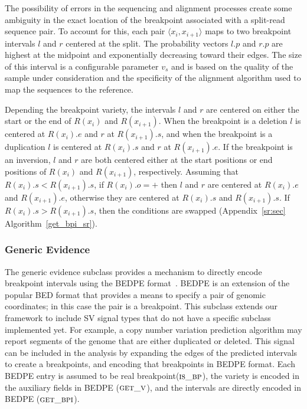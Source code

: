 \documentclass[10pt]{bmc_article}
\newenvironment{bmcformat}{\begin{raggedright}\baselineskip20pt\sloppy\setboolean{publ}{false}}{\end{raggedright}\baselineskip20pt\sloppy}
\begin{document}
\begin{bmcformat}
The possibility of errors in the sequencing and alignment processes create some
ambiguity in the exact location of the breakpoint associated with a split-read
sequence pair.  To account for this, each pair $\langle x_i, x_{i+1} \rangle$
maps to two breakpoint intervals $l$ and $r$ centered at the split. The
probability vectors $l.p$ and $r.p$ are highest at the midpoint and
exponentially decreasing toward their edges.  The size of this interval is a
configurable parameter $v_s$ and is based on the quality of the sample under
consideration and the specificity of the alignment algorithm used to map the
sequences to the reference.

Depending the breakpoint variety, the intervals $l$ and $r$ are centered on
either the start or the end of $R(x_i)$ and $R(x_{i+1})$.  When the breakpoint
is a deletion $l$ is centered at $R(x_i).e$ and $r$ at $R(x_{i+1}).s$, and when
the breakpoint is a duplication $l$ is centered at $R(x_i).s$ and $r$ at
$R(x_{i+1}).e$.  If the breakpoint is an inversion, $l$ and $r$ are both
centered either at the start positions or end positions of $R(x_i)$ and
$R(x_{i+1})$, respectively.  Assuming that $R(x_i).s<R(x_{i+1}).s$, if
$R(x_i).o=+$ then $l$ and $r$ are centered at $R(x_i).e$ and  $R(x_{i+1}).e$,
otherwise they are centered at $R(x_i).s$ and  $R(x_{i+1}).s$.  If
$R(x_i).s>R(x_{i+1}).s$, then the conditions are swapped
(Appendix~\ref{sr:sec} Algorithm~\ref{get_bpi_sr}).

\subsubsection*{Generic Evidence}

The generic evidence subclass provides a mechanism to directly encode breakpoint
intervals using the BEDPE format~\cite{quinlan2010a}.  BEDPE is an extension of
the popular BED format that provides a means to specify a pair of genomic
coordinates; in this case the pair is a breakpoint.  This subclass extends our
framework to include SV signal types that do not have a specific subclass
implemented yet.  For example, a copy number variation prediction algorithm may
report segments of the genome that are either duplicated or deleted.  This
signal can be included in the analysis by expanding the edges of the predicted
intervals to create a breakpoints, and encoding that breakpoints in BEDPE
format.
Each BEDPE entry is assumed to be real breakpoint($\textsc{is\_bp}$), the
variety is encoded in the auxiliary fields in BEDPE ($\textsc{get\_v}$), and the
intervals are directly encoded in BEDPE ($\textsc{get\_bpi}$).



\end{bmcformat}
\end{document}
